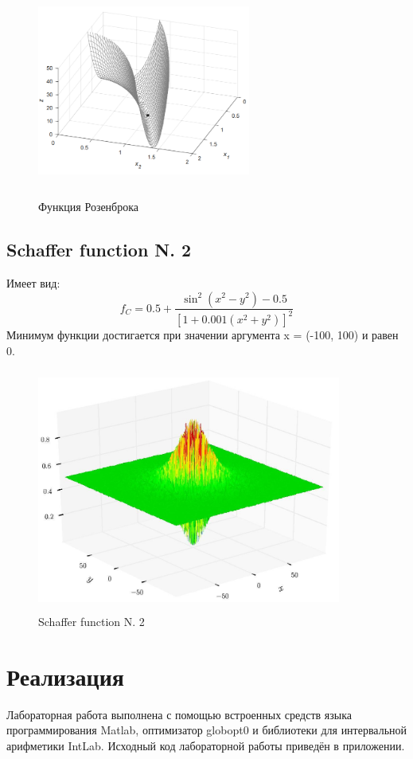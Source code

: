 \documentclass[12pt,a4paper]{scrartcl}
\begin{document}
	\begin{figure}[H]
        \centering
        \includegraphics[width=7cm,height=7cm]{fig/rosen_func.png}
        \caption{Функция Розенброка}
        \label{fig:rossen}
    	\end{figure}

	\subsection{Schaffer function N. 2}
	Имеет вид:
	\begin{equation}
	    f_{C} = 0.5 + \frac{\sin^2(x^2-y^2) - 0.5}{[1 + 0.001(x^2 + y^2)]^2}
	    \label{schaffer}
	\end{equation}
	Минимум функции достигается при значении аргумента x = (-100, 100) и равен 0.
    \begin{figure}[H]
        \centering
        \includegraphics[width=10cm,height=8cm]{fig/schaf_func.png}
        \caption{Schaffer function N. 2}
        \label{fig:schaffer}
    \end{figure}


\section {Реализация}
Лабораторная работа выполнена с помощью встроенных средств языка программирования Matlab, оптимизатор globopt0 и библиотеки для интервальной арифметики IntLab. Исходный код лабораторной работы приведён в приложении.
\end{document}
